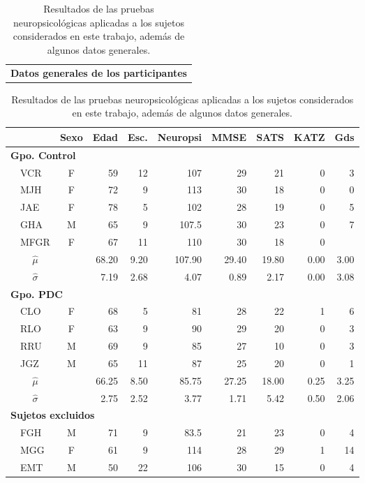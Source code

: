 \documentclass[12pt,a4paper]{mitthesis}
\newcommand{\bordes}[1]{\renewcommand{\arraystretch}{#1}}
\begin{document}
\begin{table}
\centering
\bordes{1.1}
\begin{tabular}{c}
\textbf{Datos generales de los participantes}
\vspace{1em}
\end{tabular}
\begin{small}
\begin{tabular}{llcrrrrrrr}
\toprule
 \phantom{mm}&
 & \textbf{Sexo} & \textbf{Edad} & \textbf{Esc.} & \textbf{Neuropsi} & \textbf{MMSE} & \textbf{SATS} & \textbf{KATZ} & \textbf{Gds} \\
\midrule
\multicolumn{6}{l}{\textbf{Gpo. Control}}\\
&VCR    & F    & 59   & 12   & 107      & 29   & 21   & 0    & 3 \\
&MJH    & F    & 72   & 9    & 113      & 30   & 18   & 0    & 0 \\
&JAE    & F    & 78   & 5    & 102      & 28   & 19   & 0    & 5 \\
&GHA    & M    & 65   & 9    & 107.5    & 30   & 23   & 0    & 7 \\
&MFGR   & F    & 67   & 11   & 110      & 30   & 18   & 0    &   \\
\rowcolor{gris}
&\multicolumn{1}{c}{$\widehat{\mu}$} & 
              & 68.20& 9.20 & 107.90   & 29.40& 19.80& 0.00 & 3.00\\
\rowcolor{gris}
&\multicolumn{1}{c}{$\widehat{\sigma}$} & 
              & 7.19 & 2.68 & 4.07     & 0.89 & 2.17 & 0.00 & 3.08\\
\midrule
\multicolumn{6}{l}{\textbf{Gpo. PDC}}\\
&CLO    & F    & 68   & 5    & 81       & 28   & 22   & 1    & 6 \\
&RLO    & F    & 63   & 9    & 90       & 29   & 20   & 0    & 3 \\
&RRU    & M    & 69   & 9    & 85       & 27   & 10   & 0    & 3 \\
&JGZ    & M    & 65   & 11   & 87       & 25   & 20   & 0    & 1 \\
\rowcolor{gris}
&\multicolumn{1}{c}{$\widehat{\mu}$} & 
              & 66.25& 8.50 & 85.75   & 27.25& 18.00& 0.25 & 3.25\\
\rowcolor{gris}
&\multicolumn{1}{c}{$\widehat{\sigma}$} & 
              & 2.75 & 2.52 & 3.77    & 1.71 & 5.42 & 0.50 & 2.06\\
\midrule
\multicolumn{6}{l}{\textbf{Sujetos excluidos}}\\
&FGH    & M    & 71   & 9    & 83.5     & 21   & 23   & 0    & 4  \\
&MGG    & F    & 61   & 9    & 114      & 28   & 29   & 1    & 14 \\
&EMT    & M    & 50   & 22   & 106      & 30   & 15   & 0    & 4  \\
\bottomrule
\end{tabular} 
\end{small}
\label{tab_sujetos}
\caption{Resultados de las pruebas neuropsicol\'ogicas aplicadas a los sujetos considerados en este 
trabajo, adem\'as de algunos datos generales. 
}
\end{table}
\end{document}
